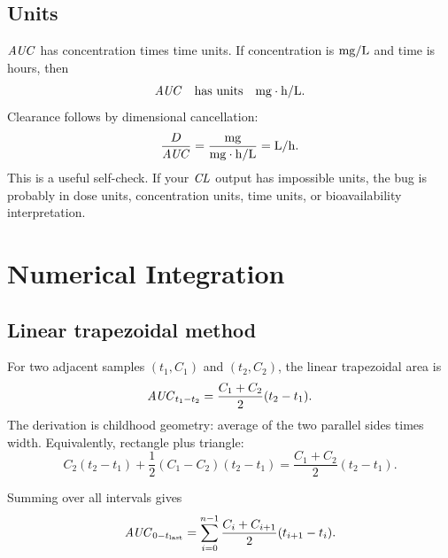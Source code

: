 \documentclass[a4paper]{article}
\newcommand{\CL}{\ensuremath{\pksym{CL}}}
\newcommand{\AUC}{\ensuremath{\pksym{AUC}}}
\newcommand{\AUClast}{\ensuremath{\pksym{AUC}_{0-t_{\pklab{last}}}}}
\begin{document}
\subsection{Units}

\AUC{} has concentration times time units. If concentration is \(\mathrm{mg/L}\) and time is hours, then
\[
  \AUC \quad\text{has units}\quad \pklab{mg\cdot h/L}.
\]
Clearance follows by dimensional cancellation:
\[
  \frac{D}{\AUC}
  =
  \frac{\pklab{mg}}{\pklab{mg\cdot h/L}}
  =
  \pklab{L/h}.
\]
This is a useful self-check. If your \CL{} output has impossible units, the bug is probably in dose units, concentration units, time units, or bioavailability interpretation.

\section{Numerical Integration}

\subsection{Linear trapezoidal method}

For two adjacent samples \((t_1,C_1)\) and \((t_2,C_2)\), the linear trapezoidal area is
\[
  \pksym{AUC}_{t_1-t_2}
  =
  \frac{C_1+C_2}{2}(t_2-t_1).
\]
The derivation is childhood geometry: average of the two parallel sides times width. Equivalently, rectangle plus triangle:
\[
  C_2(t_2-t_1)+\frac{1}{2}(C_1-C_2)(t_2-t_1)
  =
  \frac{C_1+C_2}{2}(t_2-t_1).
\]

Summing over all intervals gives
\[
  \AUClast
  =
  \sum_{i=0}^{n-1}
  \frac{C_i+C_{i+1}}{2}(t_{i+1}-t_i).
\]

\begin{center}
\end{center}
\end{document}
